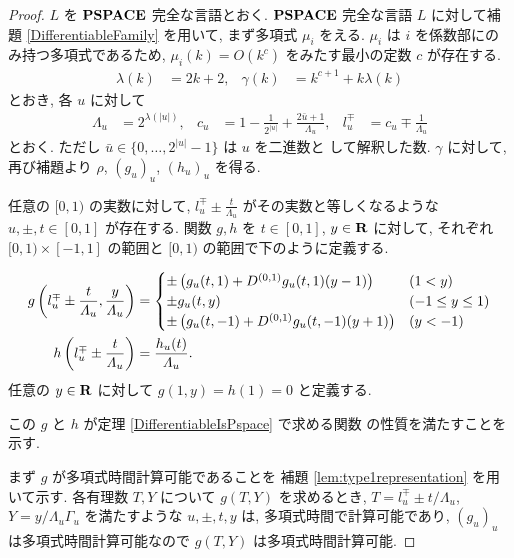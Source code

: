 \begin{proof}
 $L$ を $\mathbf{PSPACE}$ 完全な言語とおく.
 $\mathbf{PSPACE}$ 完全な言語 $L$ に対して補題 \ref{DifferentiableFamily} を用いて,
 まず多項式 $\mu_i$ をえる.
 $\mu_i$ は $i$ を係数部にのみ持つ多項式であるため,
 $\mu_i(k) = O(k^c)$ をみたす最小の定数 $c$ が存在する.
 \begin{align}
  \lambda(k) &= 2k + 2,&
  \gamma(k) &= k^{c+1} + k \lambda(k)
 \end{align}
 とおき, 各 $u$ に対して 
\begin{align}
 \Lambda_u 
 &= 2^{\lambda(|u|)}, &
 c_u 
 &= 1-\frac{1}{2^{|u|}}+\frac{2\bar{u}+1}{\Lambda_u}, &
 l_u^\mp 
 &= c_u\mp\frac{1}{\varLambda_u} 
\end{align}  
 とおく. ただし $\bar u \in \{0, \dots, 2^{|u|} - 1\}$ は $u$ を二進数と
 して解釈した数.
 $\gamma$ に対して, 再び補題より $\rho$, $(g_u)_u$, $(h_u)_u$ を得る.



 任意の $[0,1)$ の実数に対して,
 $l^\mp_u \pm \frac{t}{\Lambda_u}$ がその実数と等しくなるような
 $u, \pm, t\in [0,1]$ が存在する.
 関数 $g, h$ を $t \in [0,1]$, $y \in \mathbf R$ に対して,
 それぞれ $[0,1) \times [-1,1]$ の範囲と $[0,1)$ の範囲で下のように定義する.

 \begin{align}
  g\left(l^\mp_u \pm \frac{t}{\varLambda_u}, \frac{y}{\varLambda_u}\right)
  &= \begin{cases}
      \pm \left( g_u(t,1) 
      + D^{(0,1)}g_u(t, 1)(y-1) \right)&  (1<y)\\
      \pm g_u(t, y) & (-1 \le y \le 1) \\
      \pm \left( g_u(t, -1) + D^{(0,1)} g_u(t, -1)(y+1) \right) & (y<-1)
     \end{cases}
  \\
  h \left( l^\mp_u \pm \frac{t}{\varLambda_u} \right) 
  &= \frac{h_u(t)}{\varLambda_u}.
\end{align}
 任意の $y \in \mathbf R$ に対して $g(1,y) = h(1) = 0$ と定義する.



 この $g$ と $h$ が定理 \ref{DifferentiableIsPspace} で求める関数
 の性質を満たすことを示す.


 
 まず $g$ が多項式時間計算可能であることを
 補題 \ref{lem:type1representation} を用いて示す.
 各有理数 $T,Y$ について $g(T, Y)$ を求めるとき,
 $T=l_u^\mp \pm t/\Lambda_u$, $Y = y/\Lambda_u\Gamma_u$ を満たすような
 $u, \pm, t, y$ は, 多項式時間で計算可能であり,
 $(g_u)_u$ は多項式時間計算可能なので $g(T, Y)$ は多項式時間計算可能.




\end{proof}
